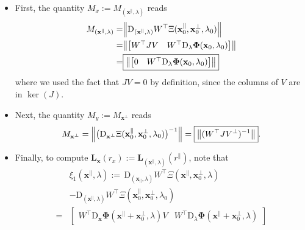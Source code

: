 \documentclass[letterpaper, 10 pt, conference, dvipsnames]{ieeeconf}
\begin{document}
\begin{itemize}
    \item First, the quantity \(M_x :=  M_{(\mathbf{x}^\parallel,\lambda)}\) reads
          \begin{align}
              M_{(\mathbf{x}^\parallel,\lambda)}  = & \norm{\mathrm{D}_{(\mathbf{x}^\parallel,\lambda)}W^\top\Xi(\mathbf{x}^\parallel_0,\mathbf{x}^\perp_0,\lambda_0)} \notag \\
              =                                     & \norm{\begin{bmatrix}W^\top JV&W^\top\mathrm{D}_\lambda\boldsymbol{\Phi}(\mathbf{x}_0,\lambda_0)\end{bmatrix}} \notag   \\
              =                                     & \boxed{\norm{\begin{bmatrix}0 &W^\top\mathrm{D}_\lambda\boldsymbol{\Phi}(\mathbf{x}_0,\lambda_0)\end{bmatrix}}}
              \label{def:M_x-LSR}
          \end{align} where we used the fact that \(JV = 0\) by definition, since the columns of \(V\) are in \(\ker(J)\).
    \item Next, the quantity \(M_y := M_{\mathbf{x}^{\perp}}\) reads
          \begin{equation}
              M_{\mathbf{x}^\perp} = \norm{\big(\mathrm{D}_{\mathbf{x}^\perp}\Xi(\mathbf{x}^\parallel_0,\mathbf{x}^\perp_0,\lambda_0)\big)^{-1}} = \boxed{\norm{(W^\top J V^{\perp})^{-1}}}.\label{def:M_y-LSR}
          \end{equation}
    \item Finally, to compute \(\mathbf{L}_{\mathbf{x}}(r_x) := \mathbf{L}_{(\mathbf{x}^\parallel,\lambda)}(r^\parallel)\), note that
          \begin{align*}
                & \xi_1 (\mathbf{x}^{\parallel},\lambda)  :=  \,\mathrm{D}_{(\mathbf{x}_{\parallel},\lambda)}W^\top\Xi(\mathbf{x}^{\parallel},\mathbf{x}^{\perp}_0,\lambda)                                                                      \\
                & - \mathrm{D}_{(\mathbf{x}^\parallel,\lambda)}W^\top\Xi(\mathbf{x}^\parallel_0,\mathbf{x}^\perp_0,\lambda_0)                                                                                                                    \\
              = & \begin{bmatrix}W^\top\mathrm{D}_{\mathbf{x}} \boldsymbol{\Phi}(\mathbf{x}^{\parallel}+\mathbf{x}^\perp_0,\lambda)V&W^\top\mathrm{D}_{\lambda}\boldsymbol{\Phi}(\mathbf{x}^{\parallel}+\mathbf{x}^\perp_0,\lambda)\end{bmatrix} \\

\end{align*}
\end{itemize}
\end{document}
